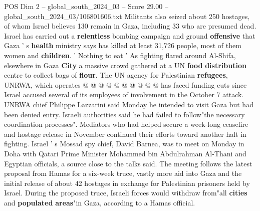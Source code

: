 \begin{textsample}{POS Dim 2 – global\_south\_2024\_03 – Score 29.00 – global\_south\_2024\_03/106801606.txt}
Militants also seized about 250 hostages, of whom Israel believes 130 remain in Gaza, including 33 who are presumed dead.
Israel has carried out a \textbf{relentless} bombing campaign and ground \textbf{offensive} that Gaza ' s \textbf{health} ministry says has killed at least 31,726 people, most of them women and \textbf{children}. ' Nothing to eat ' As fighting flared around Al-Shifa, elsewhere in Gaza \textbf{City} a massive crowd gathered at a UN \textbf{food} \textbf{distribution} centre to collect bags of \textbf{flour}.
The UN agency for Palestinian \textbf{refugees}, UNRWA, which operates @ @ @ @ @ @ @ @ @ @ has faced funding cuts since Israel accused several of its employees of involvement in the October 7 attack.
UNRWA chief Philippe Lazzarini said Monday he intended to visit Gaza but had been denied entry.
Israeli authorities said he had failed to follow"the necessary coordination processes".
Mediators who had helped secure a week-long ceasefire and hostage release in November continued their efforts toward another halt in fighting.
Israel ' s Mossad spy chief, David Barnea, was to meet on Monday in Doha with Qatari Prime Minister Mohammed bin Abdulrahman Al-Thani and Egyptian officials, a source close to the talks said.
The meeting follows the latest proposal from Hamas for a six-week truce, vastly more aid into Gaza and the initial release of about 42 hostages in exchange for Palestinian prisoners held by Israel.
During the proposed truce, Israeli forces would withdraw from"all \textbf{cities} and \textbf{populated} \textbf{areas}"in Gaza, according to a Hamas official.

\end{textsample}
